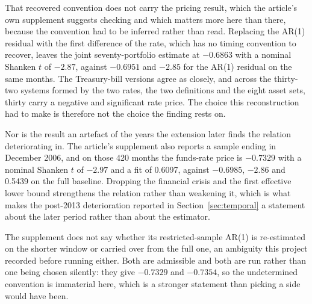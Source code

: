 \documentclass[11pt]{article}
\begin{document}
That recovered convention does not carry the pricing result, which the article's
own supplement suggests checking and which matters more here than there, because
the convention had to be inferred rather than read. Replacing the AR(1) residual %
with the first difference of the rate, which has no timing convention to recover,
leaves the joint seventy-portfolio estimate at $-0.6863$ with a nominal Shanken %
$t$ of $-2.87$, against $-0.6951$ and $-2.85$ for the AR(1) residual on the same %
months. The Treasury-bill versions agree as closely, and across the thirty-two %
systems formed by the two rates, the two definitions and the eight asset sets,
thirty carry a negative and significant rate price. The choice this %
reconstruction had to make is therefore not the choice the finding rests on.

Nor is the result an artefact of the years the extension later finds the
relation deteriorating in. The article's supplement also reports a sample ending
in December 2006, and on those 420 months the funds-rate price is $-0.7329$ with %
a nominal Shanken $t$ of $-2.97$ and a fit of 0.6097, against $-0.6985$, $-2.86$ %
and 0.5439 on the full baseline. Dropping the financial crisis and the first %
effective lower bound strengthens the relation rather than weakening it, which is
what makes the post-2013 deterioration reported in %
Section~\ref{sec:temporal} a statement about the later period rather than about
the estimator.

The supplement does not say whether its restricted-sample AR(1) is re-estimated %
on the shorter window or carried over from the full one, an ambiguity this
project recorded before running either. Both are admissible and both are run
rather than one being chosen silently: they give $-0.7329$ and $-0.7354$, so the %
undetermined convention is immaterial here, which is a stronger statement than
picking a side would have been.
\end{document}
